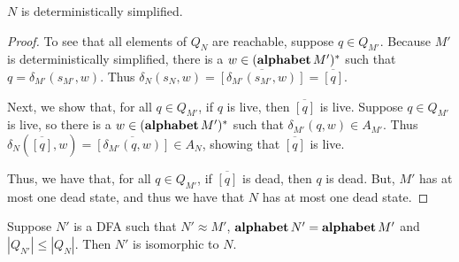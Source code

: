 \begin{lemma}
\label{MinimizationLemma7}
$N$ is deterministically simplified.
\end{lemma}

\begin{proof}
To see that all elements of $Q_N$ are reachable, suppose $q\in Q_{M'}$.
Because $M'$ is deterministically simplified, there is a
$w\in(\mathbf{alphabet}\,M')^*$ such that $q=\delta_{M'}(s_{M'},w)$.  Thus
$\delta_N(s_N,w) = \overline{[\delta_{M'}(s_{M'},w)]} = \overline{[q]}$.

Next, we show that, for all $q\in Q_{M'}$, if $q$ is live, then
$\overline{[q]}$ is live.  Suppose $q\in Q_{M'}$ is live,
so there is a $w\in(\mathbf{alphabet}\,M')^*$ such that $\delta_{M'}(q,w)\in A_{M'}$.
Thus $\delta_N(\overline{[q]},w)=\overline{[\delta_{M'}(q,w)]}\in A_N$,
showing that $\overline{[q]}$ is live.

Thus, we have that, for all $q\in Q_{M'}$, if $\overline{[q]}$ is
dead, then $q$ is dead.  But, $M'$ has at most one dead state, and
thus we have that $N$ has at most one dead state.
\end{proof}

\begin{lemma}
\label{MinimizationLemma8}
Suppose $N'$ is a DFA such that $N'\approx M'$,
$\mathbf{alphabet}\,N'=\mathbf{alphabet}\,M'$ and $|Q_{N'}|\leq|Q_N|$.  Then $N'$ is
isomorphic to $N$.
%
%
\end{lemma}

